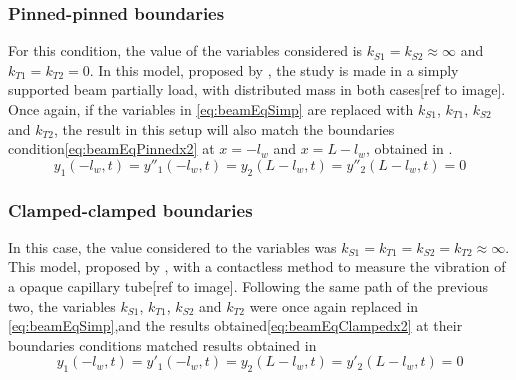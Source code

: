     \subsubsection{Pinned-pinned boundaries}
    For this condition, the value of the variables considered is $k_{S1}=k_{S2}\approx\infty$ and $k_{T1}=k_{T2}=0$. In this model, proposed by \citeauthor{chanFREEVIBRATIONSIMPLY1996}, the study is made in a simply supported beam partially load, with distributed mass in both cases[ref to image].
    Once again, if the variables in \ref{eq:beamEqSimp} are replaced with $k_{S1}$, $k_{T1}$, $k_{S2}$ and $k_{T2}$, the result in this setup will also match the boundaries condition\ref{eq:beamEqPinnedx2} at $x=-l_w$ and $x=L-l_w$, obtained in \cite{chanFREEVIBRATIONSIMPLY1996}.
    \begin{equation} \label{eq:beamEqPinnedx2}
        y_1(-l_w,t) = y''_1(-l_w,t) = y_2(L-l_w,t) = y''_2(L-l_w,t)=0
    \end{equation}
    \subsubsection{Clamped-clamped boundaries}
    In this case, the value considered to the variables was $k_{S1}=k_{T1}=k_{S2}=k_{T2}\approx\infty$. This model, proposed by \citeauthor{jacobsContactlessLiquidDetection2005}, with a contactless method to measure the vibration of a opaque capillary tube[ref to image].
    Following the same path of the previous two, the variables $k_{S1}$, $k_{T1}$, $k_{S2}$ and $k_{T2}$ were once again replaced in \ref{eq:beamEqSimp},and the results obtained\ref{eq:beamEqClampedx2} at their boundaries conditions matched results obtained in \cite{jacobsContactlessLiquidDetection2005}
    \begin{equation} \label{eq:beamEqClampedx2}
        y_1(-l_w,t) = y'_1(-l_w,t) = y_2(L-l_w,t) = y'_2(L-l_w,t)=0
    \end{equation}

